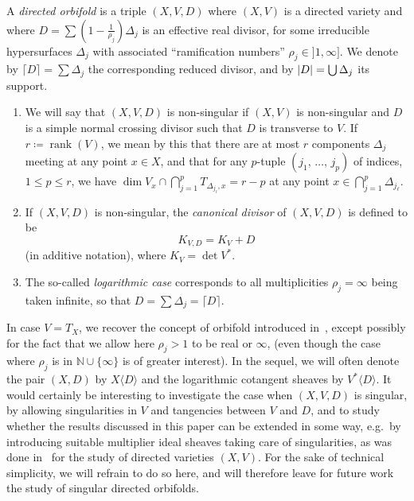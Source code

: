 \documentclass[AHL,Unicode,longabstracts,published]{cedram}
\DeclareMathOperator{\rank}{rank}
\DeclarePairedDelimiter{\abs}{\lvert}{\rvert}
\newcommand*\bN{\mathbb{N}}
\let\leq\leqslant
\newcommand*\bydef{\coloneqq}
\begin{document}
\begin{defi}
A \emph{directed orbifold} is a triple $(X,V,D)$ where $(X,V)$ is a directed variety and where $D=\sum(1-\tfrac{1}{\rho_j})\Delta_j$ is an effective real divisor, for some irreducible hypersurfaces $\Delta_j$ with associated ``ramification numbers'' $\rho_j\in{}]1,\infty]$. We denote by $\lceil D\rceil=\sum\Delta_j$ the corresponding reduced divisor, and by $\abs{D}=\bigcup \Delta_j$ its support.
\begin{enumerate}
\item We will say that $(X,V,D)$ is non-singular if $(X,V)$ is non-singular and $D$ is a simple normal crossing divisor such that $D$ is transverse to $V$. If $r\bydef\rank(V)$, we mean by this that there are at most $r$ components $\Delta_j$ meeting at any point $x\in X$, and that for any $p$-tuple $(j_1,\,\dotsc,\,j_p)$ of indices, $1\leq p\leq r$, we have $\dim V_x\cap \bigcap_{j=1}^pT_{\Delta_{j_\ell},x}=r-p$ at any point $x\in\bigcap_{j=1}^p\Delta_{j_\ell}$.
\item If $(X,V,D)$ is non-singular, the \emph{canonical divisor} of $(X,V,D)$ is defined to be
\[
K_{V,D}=K_V+ D
\]
(in additive notation), where $K_V=\det V^*$.
\item The so-called \emph{logarithmic case} corresponds to all multiplicities $\rho_j=\infty$ being taken infinite, so that $D=\sum\Delta_j=\lceil D\rceil$.
\end{enumerate}
\end{defi}

In case $V=T_X$, we recover the concept of orbifold introduced in~\cite{Cam04}, except possibly for the fact that we allow here $\rho_j>1$ to be real or $\infty$, (even though the case where $\rho_j$ is in $\bN\cup\{\infty\}$ is of greater interest). In the sequel, we will often denote the pair $(X,D)$ by $X\langle D\rangle$ and the logarithmic cotangent sheaves by $V^*\langle D\rangle$. It would certainly be interesting to investigate the case when $(X,V,D)$ is singular, by allowing singularities in $V$ and tangencies between $V$ and $D$, and to study whether the results discussed in this paper can be extended in some way, e.g.\ by introducing suitable multiplier ideal sheaves taking care of singularities, as was done in~\cite{Dem15} for the study of directed varieties $(X,V)$. For the sake of technical simplicity, we will refrain to do so here, and will therefore leave for future work the study of singular directed orbifolds.
\end{document}
